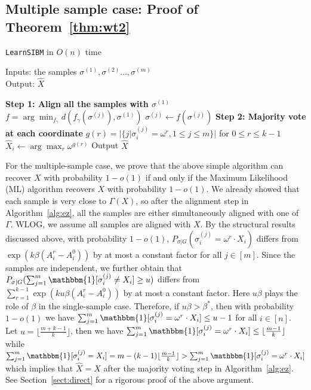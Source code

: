 \documentclass{article}
\begin{document}
\subsection{Multiple sample case: Proof of Theorem~\ref{thm:wt2}}
\label{sect:multi}

\begin{center}
	\begin{minipage}{.55\textwidth}
		\begin{algorithm}[H]
			\caption{\texttt{LearnSIBM} in $O(n)$ time} \label{alg:ez}
			Inputs: the samples $\sigma^{(1)},\sigma^{(2)}\dots,\sigma^{(m)}$ \\
			Output: $\hat{X}$
			\begin{algorithmic}[1]
				\Statex \hspace*{-0.3in} 
				{\bf Step 1: Align all the samples with $\sigma^{(1)}$ }
				\State $f=\arg\min_{f_{\gamma}} d(f_{\gamma}(\sigma^{(j)}), \sigma^{(1)})$
				\State $\sigma^{(j)} \gets f(\sigma^{(j)})$
				\EndFor
				\Statex \hspace*{-0.3in}
				{\bf Step 2: Majority vote at each coordinate}
				\State $g(r) = |\{j | \sigma^{(j)}_i = \omega^r,1\leq j \leq m\}|$ for $ 0 \leq r \leq k-1$
				\State $\hat{X}_i \gets  \arg\max_r \omega^{g(r)}$
				\State {}
				\EndFor
				\State Output $\hat{X}$
			\end{algorithmic}
		\end{algorithm}
	\end{minipage}
\end{center}
For the multiple-sample case, we prove that the above simple algorithm can recover $X$ with probability $1-o(1)$ if and only if the Maximum Likelihood (ML) algorithm recovers $X$ with probability $1-o(1)$. We already showed that each sample is very close to $\Gamma(X)$, so after the alignment step in Algorithm~\ref{alg:ez}, all the samples are either simultaneously aligned with one of $\Gamma$. WLOG, we assume all samples are aligned with $X$.
By the structural results discussed above,
with probability $1-o(1)$, $P_{\sigma|G}(\sigma_i^{(j)} = \omega^r \cdot X_i)$ differs from
$\exp (k \beta (A^r_i-A^0_i))$ by at most a constant factor for all $j\in[m]$. Since the samples are independent, we further obtain that $P_{\sigma|G}(\sum_{j=1}^m\mathbbm{1}[\sigma_i^{(j)} \neq X_i]\ge u)$ differs from $\sum_{r=1}^{k-1} \exp (k u \beta (A^r_i-A^0_i))$
by at most a constant factor.
Here $u\beta$ plays the role of $\beta$ in the single-sample case.
Therefore, if $u\beta>\beta^\ast$, then with probability $1-o(1)$
we have $\sum_{j=1}^m\mathbbm{1}[\sigma_i^{(j)}= \omega^r \cdot X_i] \le u-1$ for all $i\in[n]$.
Let $u=\lfloor \frac{m+k-1}{k} \rfloor$,
then we have $\sum_{j=1}^m\mathbbm{1}[\sigma_i^{(j)} = \omega^r \cdot X_i] \le \lfloor \frac{m-1}{k} \rfloor $
while $\sum_{j=1}^m\mathbbm{1}[\sigma_i^{(j)} = X_i]
= m - (k-1)\lfloor \frac{m-1}{k} \rfloor > \sum_{j=1}^m\mathbbm{1}[\sigma_i^{(j)} = \omega^r \cdot X_i]$
which implies that $\hat{X}=X$ after the majority voting step in Algorithm~\ref{alg:ez}. See Section~\ref{sect:direct} for a rigorous proof of the above argument.
\end{document}

